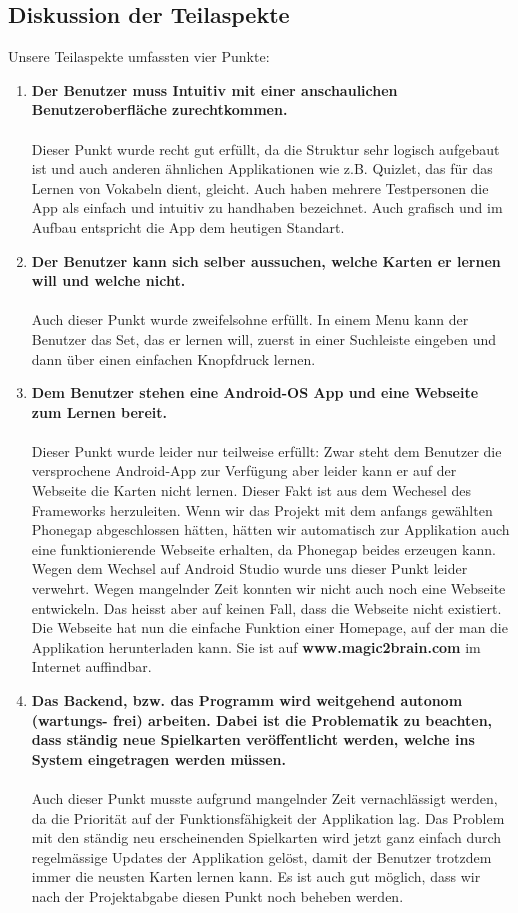 \subsection{Diskussion der Teilaspekte}
Unsere Teilaspekte umfassten vier Punkte: 
\begin{enumerate}
\item
\textbf{Der Benutzer muss Intuitiv mit einer anschaulichen Benutzeroberfläche
zurechtkommen.}
\\
\\
Dieser Punkt wurde recht gut erfüllt, da die Struktur sehr logisch aufgebaut ist und auch anderen ähnlichen Applikationen wie z.B. Quizlet, das für das Lernen von Vokabeln dient, gleicht. Auch haben mehrere Testpersonen die App als einfach und intuitiv zu handhaben bezeichnet. Auch grafisch und im Aufbau entspricht die App dem heutigen Standart.
\item
\textbf{Der Benutzer kann sich selber aussuchen, welche Karten er lernen will und
welche nicht.}
\\
\\
Auch dieser Punkt wurde zweifelsohne erfüllt. In einem Menu kann der Benutzer das Set, das er lernen will, zuerst in einer Suchleiste eingeben und dann über einen einfachen Knopfdruck lernen. 
\item
\textbf{Dem Benutzer stehen eine Android-OS App und eine Webseite zum Lernen
bereit.}
\\
\\
Dieser Punkt wurde leider nur teilweise erfüllt: Zwar steht dem Benutzer die versprochene Android-App zur Verfügung aber leider kann er auf der Webseite die Karten nicht lernen. Dieser Fakt ist aus dem Wechesel des Frameworks herzuleiten. Wenn wir das Projekt mit dem anfangs gewählten Phonegap abgeschlossen hätten, hätten wir automatisch zur Applikation auch eine funktionierende Webseite erhalten, da Phonegap beides erzeugen kann. Wegen dem Wechsel auf Android Studio wurde uns dieser Punkt leider verwehrt. Wegen mangelnder Zeit konnten wir nicht auch noch eine Webseite entwickeln. Das heisst aber auf keinen Fall, dass die Webseite nicht existiert. Die Webseite hat nun die einfache Funktion einer Homepage, auf der man die Applikation herunterladen kann. Sie ist auf \textbf{www.magic2brain.com} im Internet auffindbar.
\item
\textbf{Das Backend, bzw. das Programm wird weitgehend autonom (wartungs-
frei) arbeiten. Dabei ist die Problematik zu beachten, dass ständig neue
Spielkarten veröffentlicht werden, welche ins System eingetragen werden
müssen.}
\\
\\
Auch dieser Punkt musste aufgrund mangelnder Zeit vernachlässigt werden, da die Priorität auf der Funktionsfähigkeit der Applikation lag. Das Problem mit den ständig neu erscheinenden Spielkarten wird jetzt ganz einfach durch regelmässige Updates der Applikation gelöst, damit der Benutzer trotzdem immer die neusten Karten lernen kann. Es ist auch gut möglich, dass wir nach der Projektabgabe diesen Punkt noch beheben werden.
\end{enumerate}
